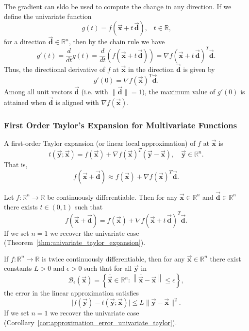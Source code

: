 \documentclass[9pt, headings=standardclasses, parskip=half]{scrartcl}
\renewcommand{\emph}[1]{\textcolor{mypurple}{#1}}
\newcommand{\vect}[1]{\vec{\boldsymbol{#1}}}
\begin{document}

The gradient can sldo be used to compute the change in any direction. If we define the univariate function
\[
g(t)=f\left(\vect{x}+t\,\vect{d}\right)\text{,} \quad t\in\mathbb{R}\text{,}
\]
for a direction \(\vect{d}\in\mathbb{R}^{n}\), then by the chain rule we have
\[
g'(t) = \frac{d}{dt}g(t) = \frac{d}{dt}\left(f\left(\vect{x}+t\,\vect{d}\right)\right) = \nabla f\left(\vect{x}+t\,\vect{d}\right)^{T}\vect{d}.
\]
Thus, the \hypertarget{directional_derivative}{\emph{directional derivative}} of \(f\) at \(\vect{x}\) in the direction \(\vect{d}\) is given by
\[
g'(0)=\nabla f(\vect{x})^{T}\vect{d}.
\]
Among all unit vectors \(\vect{d}\) (i.e. with \(\|\vect{d}\|=1\)), the maximum value of \(g'(0)\) is attained when \(\vect{d}\) is aligned with \(\nabla f(\vect{x})\).

\subsubsection{First Order Taylor's Expansion for Multivariate Functions}
A first-order Taylor expansion (or linear local approximation) of \(f\) at \(\vect{x}\) is
\[
t(\vect{y};\vect{x})=f(\vect{x})+\nabla f(\vect{x})^{T}(\vect{y}-\vect{x}),\quad \vect{y}\in\mathbb{R}^{n}.
\]
That is,
\[
f(\vect{x}+\vect{d})\approx f(\vect{x})+\nabla f(\vect{x})^{T}\vect{d}.
\]

\begin{theorem}
\label{thm:taylor_multivariate_first_order}
Let \(f:\mathbb{R}^{n}\to\mathbb{R}\) be continuously differentiable. Then for any \(\vect{x}\in\mathbb{R}^{n}\) and \(\vect{d}\in\mathbb{R}^{n}\) there exists \(t\in(0,1)\) such that
\[
f(\vect{x}+\vect{d})=f(\vect{x})+\nabla f(\vect{x}+t\,\vect{d})^{T}\vect{d}.
\]
If we set \(n=1\) we recover the univariate case (Theorem~\ref{thm:univariate_taylor_expansion}).
\end{theorem}

\begin{corollary}
\label{cor:taylor_error_multivariate_first_order}
If \(f:\mathbb{R}^{n}\to\mathbb{R}\) is twice continuously differentiable, then for any \(\vect{x}\in\mathbb{R}^{n}\) there exist constants \(L>0\) and \(\epsilon>0\) such that for all \(\vect{y}\) in
\[
\mathcal{B}_{\epsilon}\left(\vect{x}\right)=\left\{\bar{\vect{x}}\in\mathbb{R}^{n}:\left\|\bar{\vect{x}}-\vect{x}\right\|\le\epsilon\right\},
\]
the error in the linear approximation satisfies
\[
\bigl|f(\vect{y})-t(\vect{y};\vect{x})\bigr|\le L\|\vect{y}-\vect{x}\|^{2}.
\]
If we set \(n=1\) we recover the univariate case (Corollary~\ref{cor:approximation_error_univariate_taylor}).
\end{corollary}
\end{document}
